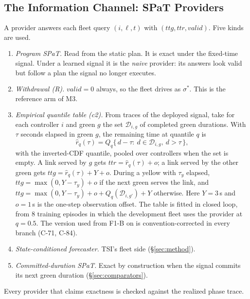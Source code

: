 \subsection{The Information Channel: SPaT Providers}\label{sec:providers}
A provider answers each fleet query $(i,\ell,t)$ with $(\mathit{ttg},\mathit{ttr},\mathit{valid})$. Five kinds are used.
\begin{enumerate}\setlength\itemsep{1pt}
\item \emph{Program SPaT.} Read from the static plan. It is exact under the fixed-time signal. Under a learned signal it is the
\emph{naive} provider: its answers look valid but follow a plan the signal no longer executes.
\item \emph{Withdrawal (R).} $\mathit{valid}=0$ always, so the fleet drives as $\sigma^*$. This is the reference arm of M3.
\item \emph{Empirical quantile table (c2).} From traces of the deployed signal, take for each controller $i$ and green $g$ the set
$\mathcal D_{i,g}$ of completed green durations. With $\tau$ seconds elapsed in green $g$, the remaining time at quantile $q$ is
\begin{equation}
\hat r_q(\tau)=Q_q\{\,d-\tau:\ d\in\mathcal D_{i,g},\ d>\tau\,\},
\end{equation}
with the inverted-CDF quantile, pooled over controllers when the set is empty. A link served by $g$ gets $\mathit{ttr}=\hat r_q(\tau)+o$;
a link served by the other green gets $\mathit{ttg}=\hat r_q(\tau)+Y+o$. During a yellow with $\tau_y$ elapsed,
$\mathit{ttg}=\max(0,Y-\tau_y)+o$ if the next green serves the link, and $\mathit{ttg}=\max(0,Y-\tau_y)+o+Q_q(\mathcal D_{i,g'})+Y$
otherwise. Here $Y=3$\,s and $o=1$\,s is the one-step observation offset. The table is fitted in closed loop, from 8 training episodes in
which the development fleet uses the provider at $q=0.5$. The version used from F1-B on is convention-corrected in every branch (C-71,
C-84).
\item \emph{State-conditioned forecaster.} TSI's fleet side (§\ref{sec:method}).
\item \emph{Committed-duration SPaT.} Exact by construction when the signal commits its next green duration
(§\ref{sec:comparators}).
\end{enumerate}
Every provider that claims exactness is checked against the realized phase trace.

